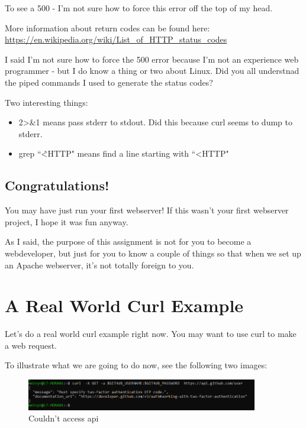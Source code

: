 \documentclass[10pt]{article}
\begin{document}
To see a 500 - I'm not sure how to force this error off the top of my head.

More information about return codes can be found here:
\url{https://en.wikipedia.org/wiki/List_of_HTTP_status_codes}

I said I'm not sure how to force the 500 error because I'm not an experience web programmer - but I do know a thing or two about Linux. Did you all understnad the piped commands I used to generate the status codes?

Two interesting things:

\begin{itemize}
\item 2\textgreater\&1 means pass stderr to stdout. Did this because curl seems to dump to stderr.
\item grep ``\^\textless HTTP" means find a line starting with ``\textless HTTP"
\end{itemize}

\subsection{Congratulations!}
You may have just run your first webserver! If this wasn't your first webserver project, I hope it was fun anyway.

As I said, the purpose of this assignment is not for you to become a webdeveloper, but just for you to know a couple of things so that when we set up an Apache webserver, it's not totally foreign to you.

\section{A Real World Curl Example}
Let's do a real world curl example right now. You may want to use curl to make a web request.

To illustrate what we are going to do now, see the following two images:

\begin{figure}[h]
  \centering
    \includegraphics[width=0.9\textwidth]{unsuccessfulGithubAPIHit.png}
  \caption{Couldn't access api}
\end{figure}
\end{document}
